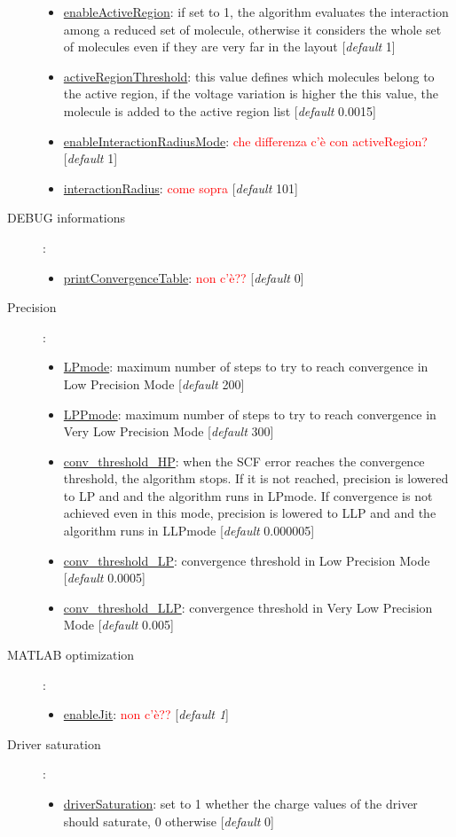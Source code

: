 \documentclass[a4paper,10pt]{article}
\begin{document}
\begin{description}
\begin{itemize}
	\item \underline{enableActiveRegion}: if set to 1, the algorithm evaluates the interaction among a reduced set of molecule, otherwise it considers the whole set of molecules even if they are very far in the layout [\textit{default} 1] 
	\item \underline{activeRegionThreshold}: this value defines which molecules belong to the active region, if the voltage variation is higher  the this value, the molecule is added to the active region list [\textit{default} 0.0015] 
	\item \underline{enableInteractionRadiusMode}: \textcolor{red}{che differenza c'è con activeRegion?} [\textit{default} 1] 
	\item \underline{interactionRadius}: \textcolor{red}{come sopra} [\textit{default} 101] 
	\end{itemize}
\item[DEBUG informations]:
	\begin{itemize}
	\item \underline{printConvergenceTable}: \textcolor{red}{non c'è??} [\textit{default} 0] 
	\end{itemize}
\item[Precision]:
	\begin{itemize}
	\item \underline{LPmode}: maximum number of steps to try to reach convergence in Low Precision Mode [\textit{default} 200] 
	\item \underline{LPPmode}: maximum number of steps to try to reach convergence in Very Low Precision Mode [\textit{default} 300] 
	\item \underline{conv\_threshold\_HP}: when the SCF error reaches the convergence threshold, the algorithm stops. If it is not reached, precision is lowered to LP and and the algorithm runs in LPmode. If convergence is not achieved even in this mode, precision is lowered to LLP and and the algorithm runs in LLPmode [\textit{default} 0.000005] 
	\item \underline{conv\_threshold\_LP}: convergence threshold in Low Precision Mode [\textit{default} 0.0005] 
	\item \underline{conv\_threshold\_LLP}: convergence threshold in Very Low Precision Mode [\textit{default} 0.005] 
	\end{itemize}
\item[MATLAB optimization]:
	\begin{itemize}
	\item \underline{enableJit}: \textcolor{red}{non c'è??} [\textit{default 1}] 
	\end{itemize}
\item[Driver saturation]:
	\begin{itemize}
	\item \underline{driverSaturation}: set to 1 whether the charge values of the driver should saturate, 0 otherwise [\textit{default} 0]
	\end{itemize}
\end{description}
\end{document}
